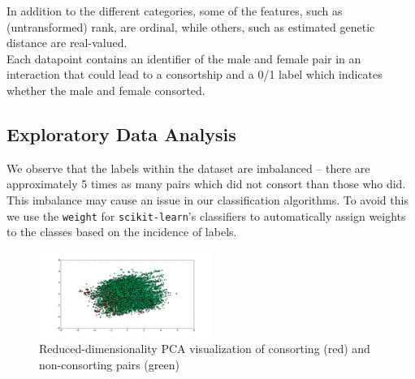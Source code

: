 \documentclass[twoside,twocolumn,paper=letter,fontsize=11pt]{article}
\begin{document}
In addition to the different categories, some of the features, such as
(untransformed) rank, are ordinal, while others, such as estimated genetic
distance are real-valued.\\

Each datapoint contains an identifier of the male and female pair in an
interaction that could lead to a consortship and a 0/1 label which indicates
whether the male and female consorted.

\subsection{Exploratory Data Analysis}

We observe that the labels within the dataset are imbalanced -- there are
approximately 5 times as many pairs which did not consort than those who did.
This imbalance may cause an issue in our classification algorithms. To avoid
this we use the \texttt{weight} for \texttt{scikit-learn}'s classifiers to
automatically assign weights to the classes based on the incidence of labels.\\
\begin{figure}
      \centering
          \includegraphics[width=0.5\textwidth]{../figs/consort_non_consort_visualization_pca.png}
  \caption{Reduced-dimensionality PCA visualization of consorting (red) and
  non-consorting pairs (green)}
  \label{fig:pca_vis}
\end{figure}
\end{document}
